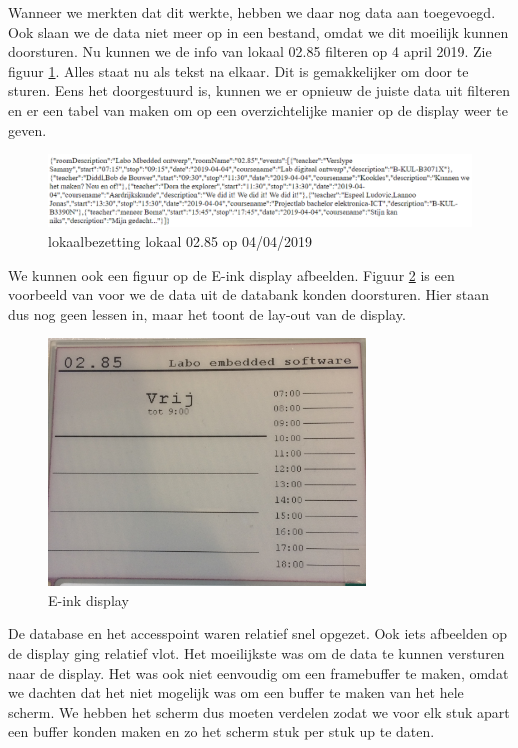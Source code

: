 \documentclass[a4paper,kul]{kulakarticle} %
\begin{document}
Wanneer we merkten dat dit werkte, hebben we daar nog data aan toegevoegd. Ook slaan we de data niet meer op in een bestand, omdat we dit moeilijk kunnen doorsturen. Nu kunnen we de info van lokaal 02.85 filteren op 4 april 2019. Zie figuur \ref{fig:vbdata}. Alles staat nu als tekst na elkaar. Dit is gemakkelijker om door te sturen. Eens het doorgestuurd is, kunnen we er opnieuw de juiste data uit filteren en er een tabel van maken om op een overzichtelijke manier op de display weer te geven.

\begin{figure}[h]
	\centering
	\includegraphics[width=1\textwidth]{vbData02_85}
	\caption{lokaalbezetting lokaal 02.85 op 04/04/2019}
	\label{fig:vbdata}
\end{figure}

We kunnen ook een figuur op de E-ink display afbeelden. Figuur \ref{fig:vbscherm} is een voorbeeld van voor we de data uit de databank konden doorsturen. Hier staan dus nog geen lessen in, maar het toont de lay-out van de display.
\newline
\begin{figure}[h]
	\centering
	\includegraphics[width=0.75\textwidth]{vbScherm}
	\caption{E-ink display}
	\label{fig:vbscherm}
\end{figure}

De database en het accesspoint waren relatief snel opgezet. Ook iets afbeelden op de display ging relatief vlot. Het moeilijkste was om de data te kunnen versturen naar de display. Het was ook niet eenvoudig om een framebuffer te maken, omdat we dachten dat het niet mogelijk was om een buffer te maken van het hele scherm. We hebben het scherm dus moeten verdelen zodat we voor elk stuk apart een buffer konden maken en zo het scherm stuk per stuk up te daten.
\end{document}
